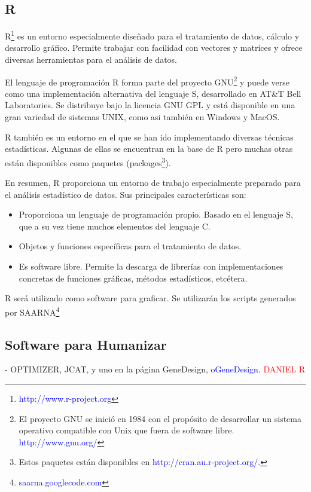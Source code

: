 \documentclass[12pt,a4paper,spanish]{article}
\begin{document}
	\subsection{R}
		\par \textsc{R}\footnote{\textcolor{blue}{http://www.r-project.org}} es un entorno especialmente diseñado para el tratamiento de datos, cálculo y 			desarrollo gráfico. Permite trabajar con facilidad con vectores y matrices y ofrece diversas herramientas para el análisis de datos.
		\par El lenguaje de programación \textsc{R} forma parte del proyecto GNU\footnote{El proyecto GNU se inició en 1984 con el propósito de 	
		desarrollar un sistema operativo compatible con Unix que fuera de software libre. \textcolor{blue}{http://www.gnu.org/}} y puede verse como una 		implementación alternativa del lenguaje \textsc{S}, desarrollado en AT\&T Bell Laboratories. Se distribuye bajo la licencia GNU GPL y está 			disponible en una gran variedad de sistemas UNIX, como asi también en Windows y MacOS.
		\par \textsc{R} también es un entorno en el que se han ido implementando diversas técnicas estadísticas. Algunas de ellas se encuentran en la base 			de R pero muchas otras están disponibles como paquetes (packages\footnote{Estos paquetes están disponibles en 
		\textcolor{blue}{http://cran.au.r-project.org/.}}).
		\par En resumen, R proporciona un entorno de trabajo especialmente preparado para el análisis estadístico de datos. Sus principales 		
		características son:
		\begin{itemize}
			\item Proporciona un lenguaje de programación propio. Basado en el lenguaje S, que a su vez tiene muchos elementos del lenguaje C. 
			\item Objetos y funciones específicas para el tratamiento de datos.
			\item Es software libre. Permite la descarga de librerías con implementaciones concretas de funciones gráficas, métodos estadísticos, etcétera.
		\end{itemize}
		\par \textsc{R} será utilizado como software para graficar. Se utilizarán los scripts generados por SAARNA\footnote{\textcolor{blue}		
		{saarna.googlecode.com}}

	\subsection{Software para Humanizar}
		- OPTIMIZER, JCAT, y uno en la página GeneDesign, \textcolor{blue}{oGeneDesign}. \textcolor{red}{DANIEL R} 
	
\end{document}
